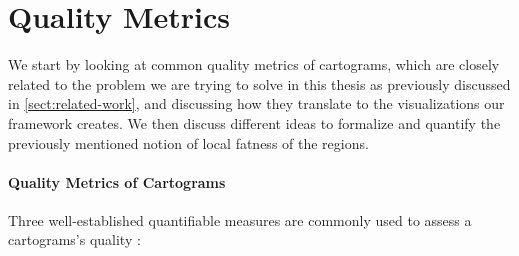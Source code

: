 \section{Quality Metrics}
\label{sect:quality-metrics}

We start by looking at common quality metrics of cartograms, which are closely related to the problem we are trying to solve in this thesis as previously discussed in \cref{sect:related-work}, and discussing how they translate to the visualizations our framework creates.
We then discuss different ideas to formalize and quantify the previously mentioned notion of local fatness of the regions.



\paragraph{Quality Metrics of Cartograms}

Three well-established quantifiable measures are commonly used to assess a cartograms's quality \cite{alam2015quantitative} \cite{nusrat2018evaluating}:

